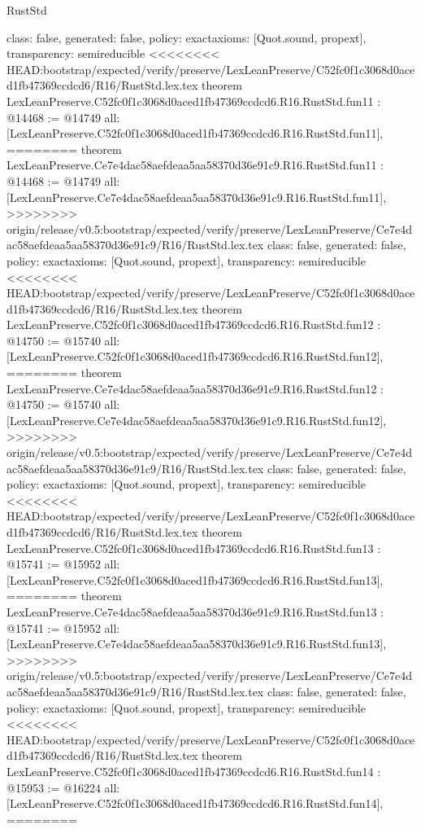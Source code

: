 \begin{lexlean}{RustStd}
\begin{coremodule}
{\begin{coremodule}
{{{{{{{{{{{{{{  class: false,
  generated: false,
  policy: exact{axioms: [Quot.sound, propext]},
  transparency: semireducible
}
<<<<<<<< HEAD:bootstrap/expected/verify/preserve/LexLeanPreserve/C52fc0f1c3068d0aced1fb47369ccdcd6/R16/RustStd.lex.tex
theorem LexLeanPreserve.C52fc0f1c3068d0aced1fb47369ccdcd6.R16.RustStd.fun11 : @14468 := @14749 {
  all: [LexLeanPreserve.C52fc0f1c3068d0aced1fb47369ccdcd6.R16.RustStd.fun11],
========
theorem LexLeanPreserve.Ce7e4dac58aefdeaa5aa58370d36e91c9.R16.RustStd.fun11 : @14468 := @14749 {
  all: [LexLeanPreserve.Ce7e4dac58aefdeaa5aa58370d36e91c9.R16.RustStd.fun11],
>>>>>>>> origin/release/v0.5:bootstrap/expected/verify/preserve/LexLeanPreserve/Ce7e4dac58aefdeaa5aa58370d36e91c9/R16/RustStd.lex.tex
  class: false,
  generated: false,
  policy: exact{axioms: [Quot.sound, propext]},
  transparency: semireducible
}
<<<<<<<< HEAD:bootstrap/expected/verify/preserve/LexLeanPreserve/C52fc0f1c3068d0aced1fb47369ccdcd6/R16/RustStd.lex.tex
theorem LexLeanPreserve.C52fc0f1c3068d0aced1fb47369ccdcd6.R16.RustStd.fun12 : @14750 := @15740 {
  all: [LexLeanPreserve.C52fc0f1c3068d0aced1fb47369ccdcd6.R16.RustStd.fun12],
========
theorem LexLeanPreserve.Ce7e4dac58aefdeaa5aa58370d36e91c9.R16.RustStd.fun12 : @14750 := @15740 {
  all: [LexLeanPreserve.Ce7e4dac58aefdeaa5aa58370d36e91c9.R16.RustStd.fun12],
>>>>>>>> origin/release/v0.5:bootstrap/expected/verify/preserve/LexLeanPreserve/Ce7e4dac58aefdeaa5aa58370d36e91c9/R16/RustStd.lex.tex
  class: false,
  generated: false,
  policy: exact{axioms: [Quot.sound, propext]},
  transparency: semireducible
}
<<<<<<<< HEAD:bootstrap/expected/verify/preserve/LexLeanPreserve/C52fc0f1c3068d0aced1fb47369ccdcd6/R16/RustStd.lex.tex
theorem LexLeanPreserve.C52fc0f1c3068d0aced1fb47369ccdcd6.R16.RustStd.fun13 : @15741 := @15952 {
  all: [LexLeanPreserve.C52fc0f1c3068d0aced1fb47369ccdcd6.R16.RustStd.fun13],
========
theorem LexLeanPreserve.Ce7e4dac58aefdeaa5aa58370d36e91c9.R16.RustStd.fun13 : @15741 := @15952 {
  all: [LexLeanPreserve.Ce7e4dac58aefdeaa5aa58370d36e91c9.R16.RustStd.fun13],
>>>>>>>> origin/release/v0.5:bootstrap/expected/verify/preserve/LexLeanPreserve/Ce7e4dac58aefdeaa5aa58370d36e91c9/R16/RustStd.lex.tex
  class: false,
  generated: false,
  policy: exact{axioms: [Quot.sound, propext]},
  transparency: semireducible
}
<<<<<<<< HEAD:bootstrap/expected/verify/preserve/LexLeanPreserve/C52fc0f1c3068d0aced1fb47369ccdcd6/R16/RustStd.lex.tex
theorem LexLeanPreserve.C52fc0f1c3068d0aced1fb47369ccdcd6.R16.RustStd.fun14 : @15953 := @16224 {
  all: [LexLeanPreserve.C52fc0f1c3068d0aced1fb47369ccdcd6.R16.RustStd.fun14],
========
}}}}}}}}}}}}}}}}}
\end{coremodule}}
\end{coremodule}
\end{lexlean}
